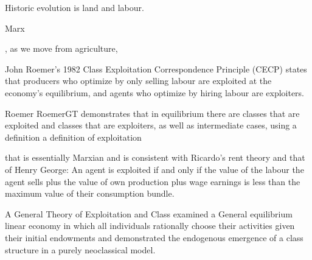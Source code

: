 

Historic evolution is land and labour.

Marx


, as we move from agriculture, 





John Roemer’s 1982 Class Exploitation Correspondence Principle (CECP) states that producers who optimize by only selling labour are exploited at the economy’s equilibrium, and agents who optimize by hiring labour are exploiters.

Roemer
RoemerGT demonstrates that in equilibrium there are classes that are exploited and classes that are exploiters, as well as intermediate cases, using  a definition a definition of exploitation 

that is essentially Marxian and is consistent with Ricardo's rent theory and that of Henry George: 
%
An agent is exploited  if and only if the value of the labour the agent sells plus the value of own production plus wage earnings is less than the maximum value of their consumption bundle.
%
%

A General Theory of Exploitation and Class examined a General equilibrium linear economy in which all individuals rationally choose their  activities given their initial endowments and demonstrated  the endogenous emergence of a class structure in a purely neoclassical model. 

